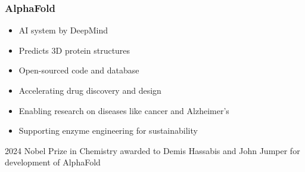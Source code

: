 \begin{frame}
    
    \begin{figure}
       \centering
    \end{figure}

\end{frame}

\begin{frame}\frametitle{AlphaFold}

    \begin{itemize}
        \item AI system by DeepMind 
            \vspace{0.5em}
        \item Predicts 3D protein structures
            \vspace{0.5em}
        \item Open-sourced code and database 
            \vspace{0.5em}
        \item Accelerating drug discovery and design
            \vspace{0.5em}
        \item Enabling research on diseases like cancer and Alzheimer's
            \vspace{0.5em}
        \item Supporting enzyme engineering for sustainability
    \end{itemize}

            \vspace{0.5em}
            \vspace{0.5em}
            \vspace{0.5em}
    2024 Nobel Prize in Chemistry awarded to Demis Hassabis and John
    Jumper for development of AlphaFold

\end{frame}


